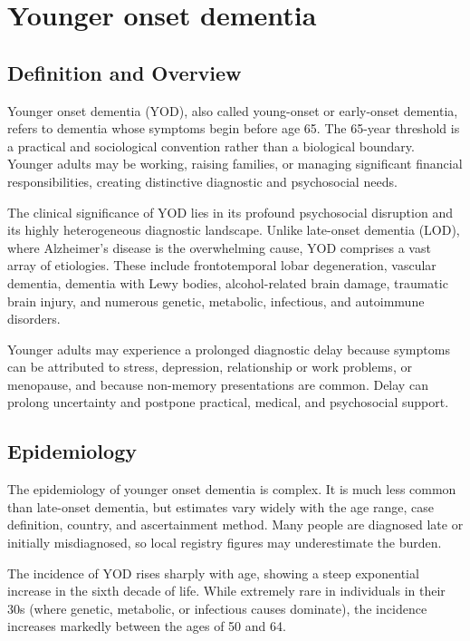 \chapter{Younger onset dementia}

\section*{Definition and Overview}
Younger onset dementia (YOD), also called young-onset or early-onset dementia, refers to dementia whose symptoms begin before age 65. The 65-year threshold is a practical and sociological convention rather than a biological boundary. Younger adults may be working, raising families, or managing significant financial responsibilities, creating distinctive diagnostic and psychosocial needs.

The clinical significance of YOD lies in its profound psychosocial disruption and its highly heterogeneous diagnostic landscape. Unlike late-onset dementia (LOD), where Alzheimer's disease is the overwhelming cause, YOD comprises a vast array of etiologies. These include frontotemporal lobar degeneration, vascular dementia, dementia with Lewy bodies, alcohol-related brain damage, traumatic brain injury, and numerous genetic, metabolic, infectious, and autoimmune disorders.

Younger adults may experience a prolonged diagnostic delay because symptoms can be attributed to stress, depression, relationship or work problems, or menopause, and because non-memory presentations are common. Delay can prolong uncertainty and postpone practical, medical, and psychosocial support.

\section*{Epidemiology}
The epidemiology of younger onset dementia is complex. It is much less common than late-onset dementia, but estimates vary widely with the age range, case definition, country, and ascertainment method. Many people are diagnosed late or initially misdiagnosed, so local registry figures may underestimate the burden.

The incidence of YOD rises sharply with age, showing a steep exponential increase in the sixth decade of life. While extremely rare in individuals in their 30s (where genetic, metabolic, or infectious causes dominate), the incidence increases markedly between the ages of 50 and 64.

